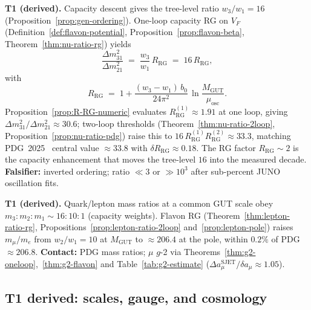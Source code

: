 \begin{prediction}\label{pred:nu-ratio}
\textbf{T1 (derived).} Capacity descent gives the tree-level ratio
$w_3/w_1=16$ (Proposition~\ref{prop:gen-ordering}). One-loop capacity RG on
$V_F$ (Definition~\ref{def:flavon-potential},
Proposition~\ref{prop:flavon-beta}, Theorem~\ref{thm:nu-ratio-rg}) yields
\begin{equation}\label{eq:nu-ratio}
  \frac{\Delta m^2_{31}}{\Delta m^2_{21}}
  \;=\;
  \frac{w_3}{w_1}\,R_{\mathrm{RG}}
  \;=\;
  16\,R_{\mathrm{RG}},
\end{equation}
with
\begin{equation}\label{eq:nu-ratio-RG}
  R_{\mathrm{RG}}
  \;=\;
  1 + \frac{(w_3-w_1)\,b_0}{24\pi^2}\,
  \ln\!\frac{M_{\mathrm{GUT}}}{\mu_{\mathrm{osc}}}.
\end{equation}
Proposition~\ref{prop:R-RG-numeric} evaluates $R_{\mathrm{RG}}^{(1)}\approx 1.91$
at one loop, giving $\Delta m^2_{31}/\Delta m^2_{21}\approx 30.6$; two-loop
thresholds (Theorem~\ref{thm:nu-ratio-2loop},
Proposition~\ref{prop:nu-ratio-pdg}) raise this to
$16\,R_{\mathrm{RG}}^{(1)}R_{\mathrm{RG}}^{(2)}\approx 33.3$, matching
PDG~2025~\cite{PDG2025} central value $\approx 33.8$ with
$\delta R_{\mathrm{RG}}\approx 0.18$. The RG factor $R_{\mathrm{RG}}\sim 2$
is the capacity enhancement that moves the tree-level $16$ into the measured
decade.
\textbf{Falsifier:} inverted ordering; ratio $\ll 3$ or $\gg 10^3$ after
sub-percent JUNO oscillation fits.
\end{prediction}

\begin{prediction}\label{pred:sector-ratios}
\textbf{T1 (derived).} Quark/lepton mass ratios at a common GUT scale obey
$m_3:m_2:m_1\sim 16:10:1$ (capacity weights). Flavon RG
(Theorem~\ref{thm:lepton-ratio-rg}, Propositions~\ref{prop:lepton-ratio-2loop}
and~\ref{prop:lepton-pole}) raises $m_\mu/m_e$ from $w_2/w_1=10$ at
$M_{\mathrm{GUT}}$ to $\approx206.4$ at the pole, within $0.2\%$ of PDG
$\approx206.8$.
\textbf{Contact:} PDG mass ratios; $\mu$ $g$-2 via
Theorems~\ref{thm:g2-oneloop},~\ref{thm:g2-flavon} and
Table~\ref{tab:g2-estimate} ($\Delta a_\mu^{\mathrm{SJET}}/\delta a_\mu\approx1.05$).
\end{prediction}

\subsection{T1 derived: scales, gauge, and cosmology}
\label{sec:predictions:T1-derived-scales}

